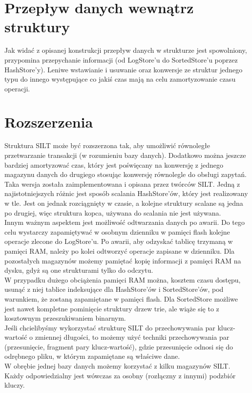 \documentclass[declaration,shortabstract,masc]{iithesis}
\begin{document}
		\section{Przepływ danych wewnątrz struktury}
			Jak widać z opisanej konstrukcji przepływ danych w strukturze jest spowolniony, przypomina przepychanie informacji (od LogStore'u do SortedStore'u poprzez HashStore'y). Leniwe wstawianie i usuwanie oraz konwersje ze struktur jednego typu do innego występujące co jakiś czas mają na celu zamortyzowanie czasu operacji.
		\section{Rozszerzenia}
			Struktura SILT może być rozszerzona tak, aby umożliwić równoległe przetwarzanie transakcji (w rozumieniu bazy danych). Dodatkowo można jeszcze bardziej amortyzować czas, który jest poświęcany na konwersję z jednego magazynu danych do drugiego stosując konwersję równolegle do obsługi zapytań. Taka wersja została zaimplementowana i opisana przez twórców SILT. Jedną z najistotniejszych różnic jest sposób scalania HashStore'ów, który jest realizowany w tle. Jest on jednak rozciągnięty w czasie, a kolejne struktury scalane są jedna po drugiej, więc struktura kopca, używana do scalania nie jest używana.\\
			\indent Innym ważnym aspektem jest możliwość odtwarzania danych po awarii. Do tego celu wystarczy zapamiętywać w osobnym dzienniku w pamięci flash kolejne operacje zlecone do LogStore'u. Po awarii, aby odzyskać tablicę trzymaną w pamięci RAM, należy po kolei odtworzyć operacje zapisane w dzienniku. Dla pozostałych magazynów możemy pamiętać kopię informacji z pamięci RAM na dysku, gdyż są one strukturami tylko do odczytu.\\
			\indent W przypadku dużego obciążenia pamięci RAM można, kosztem czasu dostępu, usunąć z niej tablice indeksujące dla HashStore'ów i SortedStore'ów, pod warunkiem, że zostaną zapamiętane w pamięci flash. Dla SortedStore możliwe jest nawet kompletne pominięcie struktury drzew trie, ale wiąże się to z kosztownym przeszukiwaniem binarnym.\\
			\indent Jeśli chcielibyśmy wykorzystać strukturę SILT do przechowywania par klucz-wartość o zmiennej długości, to możemy użyć techniki przechowywania par (przesunięcie, fragment pary klucz-wartość), gdzie przesunięcie odnosi się do odrębnego pliku, w którym zapamiętane są właściwe dane.\\
			\indent W obrębie jednej bazy danych możemy korzystać z kilku magazynów SILT. Każdy odpowiedzialny jest wówczas za osobny (rozłączny z innymi) podzbiór kluczy.
\end{document}
